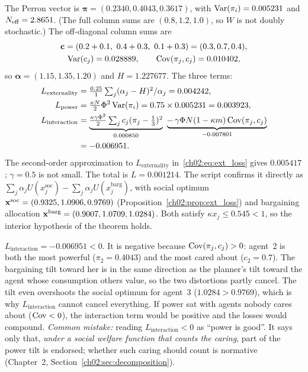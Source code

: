 \documentclass[../solutions_manual.tex]{subfiles}
\begin{document}
 The Perron vector is $\boldsymbol\pi = (0.2340, 0.4043, 0.3617)$, with $\operatorname{Var}(\pi_i) = 0.005231$ and $N_{\text{eff}} = 2.8651$. (The full column sums are $(0.8, 1.2, 1.0)$, so $W$ is not doubly stochastic.) The off-diagonal column sums are
\begin{gather*}
\mathbf c = (0.2 + 0.1,\ 0.4 + 0.3,\ 0.1 + 0.3) = (0.3, 0.7, 0.4),\\
\operatorname{Var}(c_j) = 0.028889,\qquad \operatorname{Cov}(\pi_j, c_j) = 0.010402,
\end{gather*}
so $\boldsymbol\alpha = (1.15, 1.35, 1.20)$ and $H = 1.227677$. The three terms:
\begin{align*}
L_{\text{externality}} &= \tfrac{0.25}{1}\textstyle\sum_j (\alpha_j - H)^2/\alpha_j = 0.004242,\\
L_{\text{power}} &= \tfrac{\kappa N}{2}\Phi^2\operatorname{Var}(\pi_i) = 0.75 \times 0.005231 = 0.003923,\\
L_{\text{interaction}} &= \underbrace{\tfrac{\kappa\gamma\Phi^2}{2}\textstyle\sum_j c_j(\pi_j - \tfrac13)^2}_{0.000850}\ \underbrace{-\,\gamma\Phi N(1 - \kappa m)\operatorname{Cov}(\pi_j, c_j)}_{-0.007801}\\
&= -0.006951 .
\end{align*}
The second-order approximation to $L_{\text{externality}}$ in~\eqref{ch02:eq:ext_loss} gives $0.005417$; $\gamma = 0.5$ is not small.
The total is $L = 0.001214$. The script confirms it directly as $\sum_j\alpha_jU(x^{\text{soc}}_j) - \sum_j\alpha_jU(x^{\text{barg}}_j)$, with social optimum $\mathbf{x}^{\text{soc}} = (0.9325, 1.0906, 0.9769)$ (Proposition~\ref{ch02:prop:ext_loss}) and bargaining allocation $\mathbf{x}^{\text{barg}} = (0.9007, 1.0709, 1.0284)$. Both satisfy $\kappa x_j \le 0.545 < 1$, so the interior hypothesis of the theorem holds.

 $L_{\text{interaction}} = -0.006951 < 0$. It is negative because $\operatorname{Cov}(\pi_j, c_j) > 0$: agent~2 is both the most powerful ($\pi_2 = 0.4043$) and the most cared about ($c_2 = 0.7$). The bargaining tilt toward her is in the same direction as the planner's tilt toward the agent whose consumption others value, so the two distortions partly cancel. The tilt even overshoots the social optimum for agent~3 ($1.0284 > 0.9769$), which is why $L_{\text{interaction}}$ cannot cancel everything. If power sat with agents nobody cares about ($\operatorname{Cov} < 0$), the interaction term would be positive and the losses would compound. \emph{Common mistake:} reading $L_{\text{interaction}} < 0$ as ``power is good''. It says only that, \emph{under a social welfare function that counts the caring}, part of the power tilt is endorsed; whether such caring should count is normative (Chapter~2, Section~\ref{ch02:sec:decomposition}).
\end{document}
